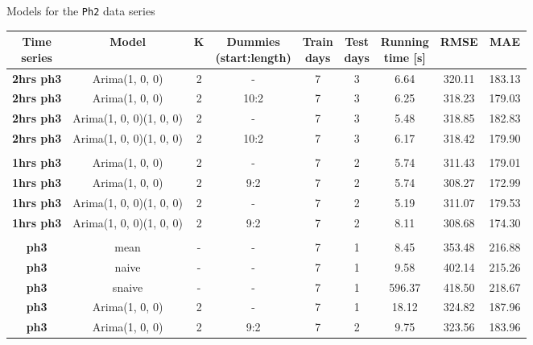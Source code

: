 \documentclass[12pt,a4paper,titlepage]{report}
\begin{document}
\begin{appendices}
\begin{table}[h]
    \centering
    \caption{Models for the \texttt{Ph2} data series}
    \label{ph2results}
\end{table}

\begin{table}[h]
    \begin{tabular}{|c|c|c|c|c|c|c|c|c|}
        \hline
        \makecell{\textbf{Time} \\ \textbf{series}} & \textbf{Model}          & \textbf{K} & \makecell{\textbf{Dummies} \\ \textbf{(start:length)}} & \makecell{\textbf{Train} \\ \textbf{days}} & \makecell{\textbf{Test}\\ \textbf{days}} & \makecell{\textbf{Running} \\ \textbf{time {[}s{]}}} & \textbf{RMSE} & \textbf{MAE} \\ \hline
\textbf{2hrs ph3} & Arima(1, 0, 0)          & 2 & -    & 7 & 3 & 6.64   & 320.11 & 183.13 \\ \hline
\textbf{2hrs ph3} & Arima(1, 0, 0)          & 2 & 10:2 & 7 & 3 & 6.25   & 318.23 & 179.03 \\ \hline
\textbf{2hrs ph3} & Arima(1, 0, 0)(1, 0, 0) & 2 & -    & 7 & 3 & 5.48   & 318.85 & 182.83 \\ \hline
\textbf{2hrs ph3} & Arima(1, 0, 0)(1, 0, 0) & 2 & 10:2 & 7 & 3 & 6.17   & 318.42 & 179.90 \\ \hline
\textbf{}         &                         &   &      &   &   &        &        &        \\ \hline
\textbf{1hrs ph3} & Arima(1, 0, 0)          & 2 & -    & 7 & 2 & 5.74   & 311.43 & 179.01 \\ \hline
\textbf{1hrs ph3} & Arima(1, 0, 0)          & 2 & 9:2  & 7 & 2 & 5.74   & 308.27 & 172.99 \\ \hline
\textbf{1hrs ph3} & Arima(1, 0, 0)(1, 0, 0) & 2 & -    & 7 & 2 & 5.19   & 311.07 & 179.53 \\ \hline
\textbf{1hrs ph3} & Arima(1, 0, 0)(1, 0, 0) & 2 & 9:2  & 7 & 2 & 8.11   & 308.68 & 174.30 \\ \hline
\textbf{}         &                         &   &      &   &   &        &        &        \\ \hline
\textbf{ph3}      & mean                    & - & -    & 7 & 1 & 8.45   & 353.48 & 216.88 \\ \hline
\textbf{ph3}      & naive                   & - & -    & 7 & 1 & 9.58   & 402.14 & 215.26 \\ \hline
\textbf{ph3}      & snaive                  & - & -    & 7 & 1 & 596.37 & 418.50 & 218.67 \\ \hline
\textbf{ph3}      & Arima(1, 0, 0)          & 2 & -    & 7 & 1 & 18.12  & 324.82 & 187.96 \\ \hline
\textbf{ph3}      & Arima(1, 0, 0)          & 2 & 9:2  & 7 & 2 & 9.75   & 323.56 & 183.96 \\ \hline


\end{tabular}
\end{table}
\end{appendices}
\end{document}
